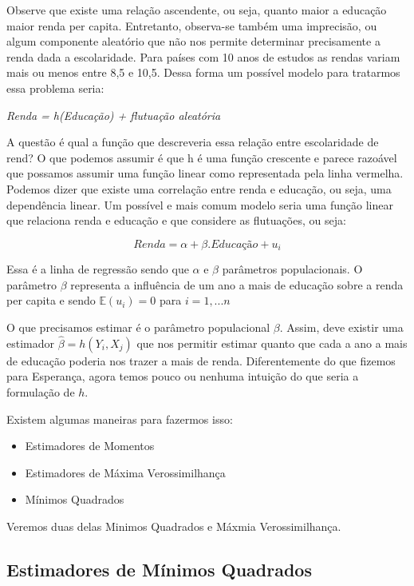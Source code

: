 \documentclass[
  letterpaper,
  DIV=11,
  numbers=noendperiod]{scrartcl}
\begin{document}
Observe que existe uma relação ascendente, ou seja, quanto maior a
educação maior renda per capita. Entretanto, observa-se também uma
imprecisão, ou algum componente aleatório que não nos permite determinar
precisamente a renda dada a escolaridade. Para países com 10 anos de
estudos as rendas variam mais ou menos entre 8,5 e 10,5. Dessa forma um
possível modelo para tratarmos essa problema seria:

\begin{center}
\textit{Renda  = h(Educação) + flutuação aleatória}
\end{center}

A questão é qual a função que descreveria essa relação entre
escolaridade de rend? O que podemos assumir é que h é uma função
crescente e parece razoável que possamos assumir uma função linear como
representada pela linha vermelha. Podemos dizer que existe uma
correlação entre renda e educação, ou seja, uma dependência linear. Um
possível e mais comum modelo seria uma função linear que relaciona renda
e educação e que considere as flutuações, ou seja:

\[Renda=\alpha+\beta . Educação + u_i\]

Essa é a linha de regressão sendo que \(\alpha\) e \(\beta\) parâmetros
populacionais. O parâmetro \(\beta\) representa a influência de um ano a
mais de educação sobre a renda per capita e sendo \(\mathbb{E}(u_i)=0\)
para \(i=1,...n\)

O que precisamos estimar é o parâmetro populacional \(\beta\). Assim,
deve existir uma estimador \(\hat{\beta}=h(Y_i,X_j)\) que nos permitir
estimar quanto que cada a ano a mais de educação poderia nos trazer a
mais de renda. Diferentemente do que fizemos para Esperança, agora temos
pouco ou nenhuma intuição do que seria a formulação de \(h\).

Existem algumas maneiras para fazermos isso:

\begin{itemize}
 \item Estimadores de Momentos
 \item Estimadores de Máxima Verossimilhança  
 \item Mínimos Quadrados
\end{itemize}

Veremos duas delas Minimos Quadrados e Máxmia Verossimilhança.

\subsection{Estimadores de Mínimos
Quadrados}\label{estimadores-de-muxednimos-quadrados}
\end{document}
